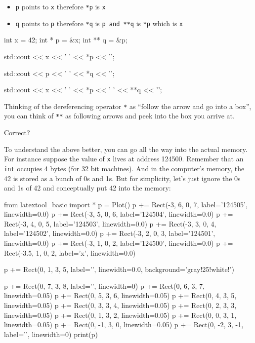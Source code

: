 \begin{itemize}

\item
  \texttt{p} points to \texttt{x} therefore \texttt{*p} is \texttt{x}
\item
  \texttt{q} points to \texttt{p} therefore \texttt{*q} is \texttt{p and **q} is
  \texttt{*p} which is \texttt{x}
\end{itemize}

\begin{consolethree}[escapeinside=||]
int x = 42;
int * p = &x;
int ** q = &p;

std::cout << x << ' ' << *p << '\n';

std::cout << p << ' ' << *q << '\n';

std::cout << x << ' ' << *p << ' '
          << **q << '\n';
\end{consolethree}
Thinking of the dereferencing operator \texttt{*} as ``follow the arrow and go into a box'', you can think of \texttt{**} as following  arrows and peek into the box you arrive at.

Correct?

To understand the above better, you can go all the way into the actual memory. For instance suppose the value of \texttt{x} lives at address 124500. Remember that an \texttt{int} occupies 4 bytes (for 32 bit machines). And in the computer's memory, the 42 is stored as a bunch of 0s and 1s. But for simplicity, let's just ignore the 0s and 1s of 42 and conceptually put 42 into the memory:

\begin{python}
from latextool_basic import *
p = Plot()
p += Rect(-3, 6, 0, 7, label='124505', linewidth=0.0)
p += Rect(-3, 5, 0, 6, label='124504', linewidth=0.0)
p += Rect(-3, 4, 0, 5, label='124503', linewidth=0.0)
p += Rect(-3, 3, 0, 4, label='124502', linewidth=0.0)
p += Rect(-3, 2, 0, 3, label='124501', linewidth=0.0)
p += Rect(-3, 1, 0, 2, label='124500', linewidth=0.0)
p += Rect(-3.5, 1, 0, 2, label='x', linewidth=0.0)

p += Rect(0, 1, 3, 5, label='', linewidth=0.0, background='gray!25!white!')

p += Rect(0, 7, 3, 8, label='', linewidth=0)
p += Rect(0, 6, 3, 7, linewidth=0.05)
p += Rect(0, 5, 3, 6, linewidth=0.05)
p += Rect(0, 4, 3, 5, linewidth=0.05)
p += Rect(0, 3, 3, 4, linewidth=0.05)
p += Rect(0, 2, 3, 3, linewidth=0.05)
p += Rect(0, 1, 3, 2, linewidth=0.05)
p += Rect(0, 0, 3, 1, linewidth=0.05)
p += Rect(0, -1, 3, 0, linewidth=0.05)
p += Rect(0, -2, 3, -1, label='', linewidth=0)
print(p)
\end{python}



